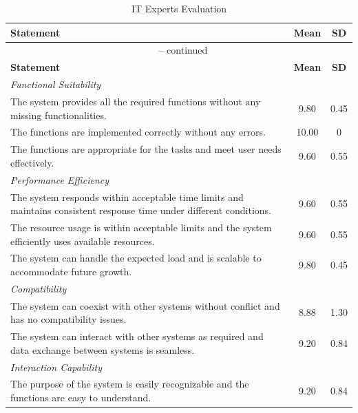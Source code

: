 \begin{appendices}
\begin{centerappendixtitle}
\begin{spacing}{1.3}
\begin{longtable}{p{12cm}cc}
	    \end{longtable}
		\end{spacing}
        
        \pagebreak
        \begin{spacing}{1.3}
		\begin{longtable}{p{12cm}cc}
			\caption{IT Experts Evaluation} \\
			\hline
			\textbf{Statement} & \textbf{Mean} & \textbf{SD} \\
			\hline
			\endfirsthead
			
			\multicolumn{3}{c}{{\tablename\ \thetable{} -- 
			continued}} \\
			\hline
			\textbf{Statement} & \textbf{Mean} & \textbf{SD} \\
			\hline
			\endhead
			  \multicolumn{2}{l}{\textit{Functional Suitability}} \\
			  The system provides all the required functions without any missing functionalities.
			  & 9.80 & 0.45  \\
			  The functions are implemented correctly without any errors.
			  & 10.00 & 0  \\
			  The functions are appropriate for the tasks and meet user needs effectively.
			  & 9.60 & 0.55  \\ \hline
			  \multicolumn{2}{l}{\textit{Performance Efficiency}} \\
			  The system responds within acceptable time limits and maintains consistent response time under different conditions.
			  & 9.60 & 0.55  \\
			  The resource usage is within acceptable limits and the system efficiently uses available resources.
			  & 9.60 & 0.55  \\
			  The system can handle the expected load and is scalable to accommodate future growth.
			  & 9.80 & 0.45  \\ \hline
			  \multicolumn{2}{l}{\textit{Compatibility}} \\
			  The system can coexist with other systems without conflict and has no compatibility issues.
			  & 8.88 & 1.30  \\
			  The system can interact with other systems as required and data exchange between systems is seamless.
			  & 9.20 & 0.84  \\ \hline
			  \multicolumn{2}{l}{\textit{Interaction Capability}} \\
			  The purpose of the system is easily recognizable and the functions are easy to understand.
			  & 9.20 & 0.84  \\

\end{longtable}
\end{spacing}
\end{centerappendixtitle}
\end{appendices}
